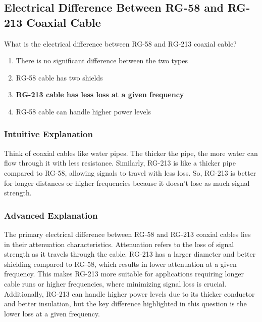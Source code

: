 \subsection{Electrical Difference Between RG-58 and RG-213 Coaxial Cable}
\label{T9B10}

\begin{tcolorbox}[colback=gray!10!white,colframe=black!75!black,title=T9B10]
What is the electrical difference between RG-58 and RG-213 coaxial cable?
\begin{enumerate}[noitemsep]
    \item There is no significant difference between the two types
    \item RG-58 cable has two shields
    \item \textbf{RG-213 cable has less loss at a given frequency}
    \item RG-58 cable can handle higher power levels
\end{enumerate}
\end{tcolorbox}

\subsubsection{Intuitive Explanation}
Think of coaxial cables like water pipes. The thicker the pipe, the more water can flow through it with less resistance. Similarly, RG-213 is like a thicker pipe compared to RG-58, allowing signals to travel with less loss. So, RG-213 is better for longer distances or higher frequencies because it doesn't lose as much signal strength.

\subsubsection{Advanced Explanation}
The primary electrical difference between RG-58 and RG-213 coaxial cables lies in their attenuation characteristics. Attenuation refers to the loss of signal strength as it travels through the cable. RG-213 has a larger diameter and better shielding compared to RG-58, which results in lower attenuation at a given frequency. This makes RG-213 more suitable for applications requiring longer cable runs or higher frequencies, where minimizing signal loss is crucial. Additionally, RG-213 can handle higher power levels due to its thicker conductor and better insulation, but the key difference highlighted in this question is the lower loss at a given frequency.